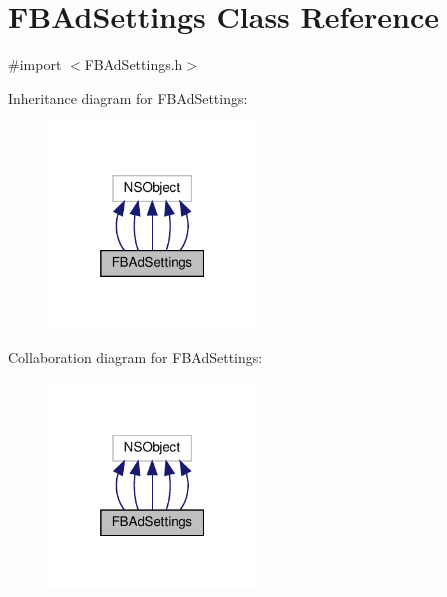 \hypertarget{interfaceFBAdSettings}{}\section{F\+B\+Ad\+Settings Class Reference}
\label{interfaceFBAdSettings}


{\ttfamily \#import $<$F\+B\+Ad\+Settings.\+h$>$}



Inheritance diagram for F\+B\+Ad\+Settings\+:
\nopagebreak
\begin{figure}[H]
\begin{center}
\leavevmode
\includegraphics[width=157pt]{interfaceFBAdSettings__inherit__graph}
\end{center}
\end{figure}


Collaboration diagram for F\+B\+Ad\+Settings\+:
\nopagebreak
\begin{figure}[H]
\begin{center}
\leavevmode
\includegraphics[width=157pt]{interfaceFBAdSettings__coll__graph}
\end{center}
\end{figure}
